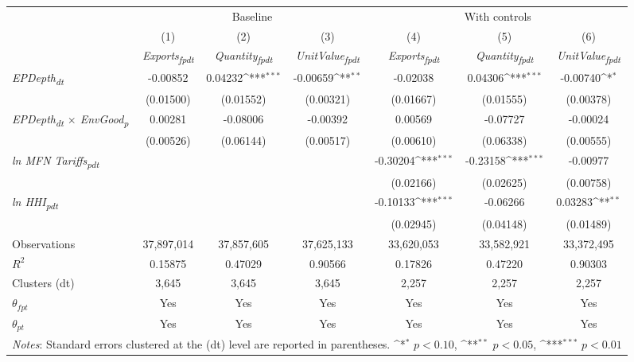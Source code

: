 {
\def\sym#1{\ifmmode^{#1}\else\(^{#1}\)\fi}
\begin{tabular}{l*{6}{c}}
\toprule
&\multicolumn{3}{c}{Baseline}&\multicolumn{3}{c}{With controls}\\\cmidrule(lr){2-4}\cmidrule(lr){5-7}
&(1)&(2)&(3)&(4)&(5)&(6)\\
&\textit{Exports\textsubscript{fpdt}}&\textit{Quantity\textsubscript{fpdt}}&\textit{UnitValue\textsubscript{fpdt}}&\textit{Exports\textsubscript{fpdt}}&\textit{Quantity\textsubscript{fpdt}}&\textit{UnitValue\textsubscript{fpdt}}\\
\midrule
\textit{EPDepth\textsubscript{dt}} & -0.00852 & 0.04232\sym{***} & -0.00659\sym{**} & -0.02038 & 0.04306\sym{***} & -0.00740\sym{*}\\
 & (0.01500) & (0.01552) & (0.00321) & (0.01667) & (0.01555) & (0.00378)\\
\addlinespace
\textit{EPDepth\textsubscript{dt} $\times$ EnvGood\textsubscript{p}} & 0.00281 & -0.08006 & -0.00392 & 0.00569 & -0.07727 & -0.00024\\
 & (0.00526) & (0.06144) & (0.00517) & (0.00610) & (0.06338) & (0.00555)\\
\addlinespace
\textit{ln MFN Tariffs\textsubscript{pdt}} &  &  &  & -0.30204\sym{***} & -0.23158\sym{***} & -0.00977\\
 &  &  &  & (0.02166) & (0.02625) & (0.00758)\\
\addlinespace
\textit{ln HHI\textsubscript{pdt}} &  &  &  & -0.10133\sym{***} & -0.06266 & 0.03283\sym{**}\\
 &  &  &  & (0.02945) & (0.04148) & (0.01489)\\
\midrule
Observations & 37,897,014 & 37,857,605 & 37,625,133 & 33,620,053 & 33,582,921 & 33,372,495\\
$R^{2}$ & 0.15875 & 0.47029 & 0.90566 & 0.17826 & 0.47220 & 0.90303\\
Clusters (dt) & 3,645 & 3,645 & 3,645 & 2,257 & 2,257 & 2,257\\
$\theta_{fpt}$ & Yes & Yes & Yes & Yes & Yes & Yes\\
$\theta_{pt}$ & Yes & Yes & Yes & Yes & Yes & Yes\\
\bottomrule
\multicolumn{7}{l}{\footnotesize \textit{Notes}: Standard errors clustered at the (dt) level are reported in parentheses. \sym{*} \(p<0.10\), \sym{**} \(p<0.05\), \sym{***} \(p<0.01\)}\\
\end{tabular}
}
